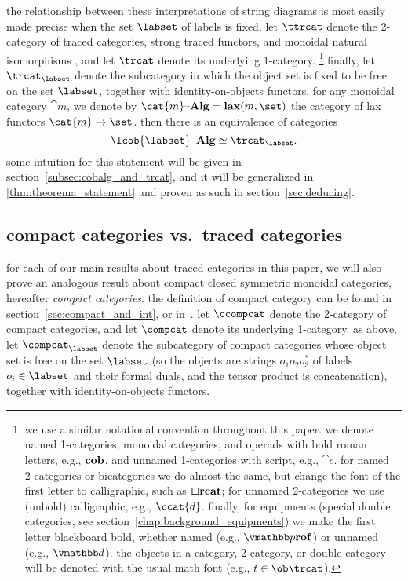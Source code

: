 \documentclass[11pt,oneside,article]{memoir}
\begin{document}
the relationship between these interpretations of string diagrams is most easily made precise when
the set $\labset$ of labels is fixed. let $\ttrcat$ denote the 2-category of traced categories,
strong traced functors, and monoidal natural isomorphisms \cite{hk}, and let $\trcat$ denote its
underlying 1-category.%
\footnote{
   we use a similar notational convention throughout this paper. we denote named 1-categories,
   monoidal categories, and operads with bold roman letters, e.g., $\mathbf{cob}$, and unnamed
   1-categories with script, e.g., $\cat{c}$. for named 2-categories or bicategories we do almost
   the same, but change the font of the first letter to calligraphic, such as $\bm{\mathcal{t}}\mathbf{rcat}$; for
   unnamed 2-categories we use (unbold) calligraphic, e.g., $\ccat{d}$. finally, for equipments
   (special double categories, see section~\ref{chap:background_equipments}) we make the first letter
   blackboard bold, whether named (e.g., $\ndcat{p}{rof}$) or unnamed (e.g., $\dcat{d}$). the
   objects in a category, 2-category, or double category will be denoted with the usual math font
   (e.g., $t\in\ob\trcat$).
}
finally, let $\trcat_{\labset}$ denote the subcategory in which the object set is fixed to be free
on the set $\labset$, together with identity-on-objects functors. for
any monoidal category $\cat{m}$, we denote by $\cat{m}\alg=\ncat{lax}(m,\set)$ the category of lax
functors $\cat{m}\to\set$. then there is an equivalence of categories
\begin{equation}\label{eq:single_fiber_tr}
   \lcob{\labset}\alg\equiv\trcat_{\labset}.
\end{equation}
some intuition for this statement will be given in section~\ref{subsec:cobalg_and_trcat}, and it
will be generalized in \ref{thm:theorema_statement} and proven as such in section~\ref{sec:deducing}.

\subsection{compact categories vs.\ traced categories}

for each of our main results about traced categories in this paper, we will also prove an analogous
result about compact closed symmetric monoidal categories, hereafter \emph{compact categories}. the
definition of compact category can be found in section~\ref{sec:compact_and_int}, or
in~\cite{maclane}. let $\ccompcat$ denote the 2-category of compact categories, and let $\compcat$
denote its underlying 1-category. as above, let $\compcat_{\labset}$ denote the subcategory of
compact categories whose object set is free on the set $\labset$ (so the objects are strings
$o_1o_2o_3^*$ of labels $o_i\in\labset$ and their formal duals, and the tensor product is
concatenation), together with identity-on-objects functors.
\end{document}
